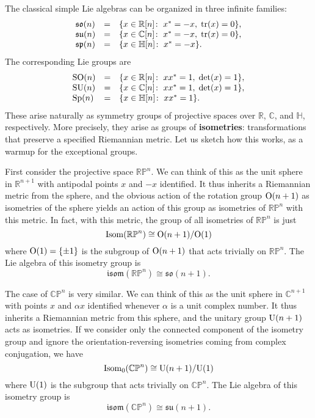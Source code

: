 \documentclass[12pt]{article}
\newcommand\R{{\mathbb R}}
\newcommand\C{{\mathbb C}}
\renewcommand\H{{\mathbb H}}
\newcommand\RP{{\mathbb {RP}}}
\newcommand\CP{{\mathbb {CP}}}
\newcommand{\OO}{{\rm O}}
\newcommand{\SO}{{\rm SO}}
\newcommand{\SU}{{\rm SU}}
\newcommand{\Sp}{{\rm Sp}}
\newcommand{\U}{{\rm U}}
\newcommand{\so}{{\mathfrak {so}}}
\newcommand{\symp}{{\mathfrak {sp}}}
\newcommand{\su}{{\mathfrak {su}}}
\newcommand{\isom}{{\mathfrak {isom}}}
\newcommand{\Isom}{{\rm Isom}}
\newcommand{\iso}{\cong}
\newcommand{\tr}{{\rm tr}}
\begin{document}
The classical simple Lie algebras can be organized in three infinite
families:
\[
\begin{array}{lcl}
 \so(n) &=&  \{ x \in \R[n] \colon \; x^* = -x, \; \tr(x) = 0\},   \\
 \su(n) &=&  \{ x \in \C[n] \colon \; x^* = -x, \; \tr(x) = 0\},   \\
 \symp(n) &=&  \{ x \in \H[n] \colon \; x^* = -x \}.   
\end{array}
\]
The corresponding Lie groups are
\[
\begin{array}{lcl}
 \SO(n) &=&  \{ x \in \R[n] \colon \; xx^* = 1, \; \det(x) = 1\},   \\
 \SU(n) &=&  \{ x \in \C[n] \colon \; xx^* = 1, \; \det(x) = 1\},   \\
 \Sp(n) &=&  \{ x \in \H[n] \colon \; xx^* = 1 \}.   
\end{array}
\]
These arise naturally as symmetry groups of projective spaces over
$\R$, $\C$, and $\H$, respectively.   More precisely, they arise as
groups of {\bf isometries}: transformations that preserve a specified
Riemannian metric.  Let us sketch how this works, as a warmup for the 
exceptional groups.  

First consider the projective space $\RP^n$.  We can think of this as
the unit sphere in $\R^{n+1}$ with antipodal points $x$ and $-x$
identified.  It thus inherits a Riemannian metric from the sphere,
and the obvious action of the rotation group $\OO(n+1)$ as isometries
of the sphere yields an action of this group as isometries of $\RP^n$
with this metric.  In fact, with this metric, the group of all isometries 
of $\RP^n$ is just 
\[       \Isom(\RP^n) \iso \OO(n+1)/\OO(1)  \]
where $\OO(1) = \{\pm 1\}$ is the subgroup of $\OO(n+1)$ that acts trivially
on $\RP^n$.  The Lie algebra of this isometry group is 
\[       \isom(\RP^n) \iso \so(n+1) .\]

The case of $\CP^n$ is very similar.  We can think of this as the unit
sphere in  $\C^{n+1}$ with points $x$ and $\alpha x$ identified whenever
$\alpha$ is a unit complex number.  It thus inherits a Riemannian metric
from this sphere, and the unitary group $\U(n+1)$ acts as isometries.  
If we consider only the connected component of the isometry group and 
ignore the orientation-reversing isometries coming from complex 
conjugation, we have
\[       \Isom_0(\CP^n) \iso \U(n+1)/\U(1)  \]
where $\U(1)$ is the subgroup that acts trivially on $\CP^n$.  
The Lie algebra of this isometry group is
\[       \isom(\CP^n) \iso \su(n+1)  .\]
\end{document}
